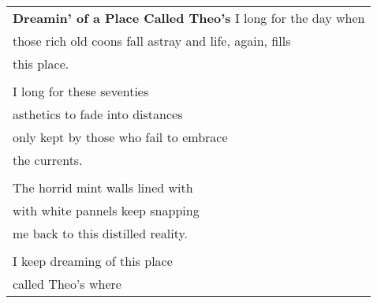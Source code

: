 \documentclass{article}
\begin{document}
\newcommand{\h}{\hspace{3ex}}
\newcommand{\hoar}{%
\begin{center}
\line(1,0){350}
\end{center}
}

\begin{center}
\begin{tabular}{l}
\textbf{Dreamin' of a Place Called Theo's}
I long for the day when \\
those rich old coons fall astray
and life, again, fills \\
this place. \\
\\
I long for these seventies \\
asthetics to fade into distances \\
only kept by those who fail to embrace \\
the currents. \\
\\
The horrid mint walls lined with \\
with white pannels keep snapping \\
me back to this distilled reality. \\
\\
I keep dreaming of this place \\
called Theo's where 

\end{tabular}
\end{center}
\end{document}
